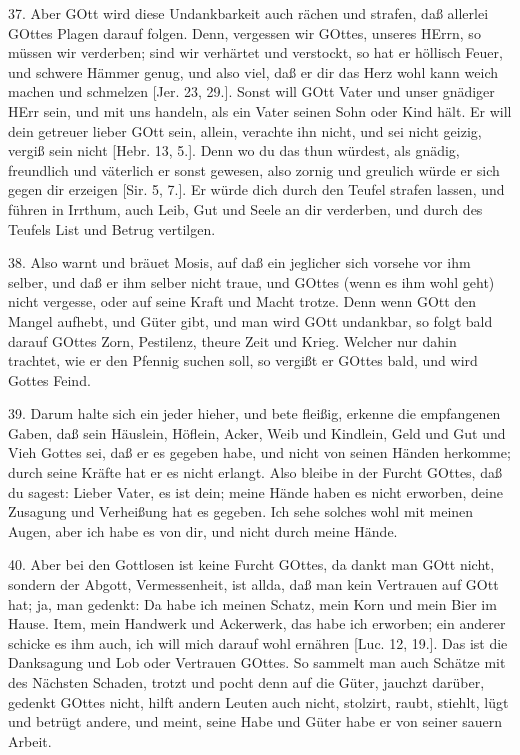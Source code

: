 37. Aber GOtt wird diese Undankbarkeit auch rächen und strafen, daß allerlei GOttes Plagen darauf folgen. Denn, vergessen wir GOttes, unseres HErrn, so müssen wir verderben; sind wir verhärtet und verstockt, so hat er höllisch Feuer, und schwere Hämmer genug, und also viel, daß er dir das Herz wohl kann weich machen und schmelzen [Jer. 23, 29.]. Sonst will GOtt Vater und unser gnädiger HErr sein, und mit uns handeln, als ein Vater seinen Sohn oder Kind hält. Er will dein getreuer lieber GOtt sein, allein, verachte ihn nicht, und sei nicht geizig, vergiß sein nicht [Hebr. 13, 5.]. Denn wo du das thun würdest, als gnädig, freundlich und väterlich er sonst gewesen, also zornig und greulich würde er sich gegen dir erzeigen [Sir. 5, 7.]. Er würde dich durch den Teufel strafen lassen, und führen in Irrthum, auch Leib, Gut und Seele an dir verderben, und durch des Teufels List und Betrug vertilgen.

38. Also warnt und bräuet Mosis, auf daß ein jeglicher sich vorsehe vor ihm selber, und daß er ihm selber nicht traue, und GOttes (wenn es ihm wohl geht) nicht vergesse, oder auf seine Kraft und Macht trotze. Denn wenn GOtt den Mangel aufhebt, und Güter gibt, und man wird GOtt undankbar, so folgt bald darauf GOttes Zorn, Pestilenz, theure Zeit und Krieg. Welcher nur dahin trachtet, wie er den Pfennig suchen soll, so vergißt er GOttes bald, und wird Gottes Feind.

39. Darum halte sich ein jeder hieher, und bete fleißig, erkenne die empfangenen Gaben, daß sein Häuslein, Höflein, Acker, Weib und Kindlein, Geld und Gut und Vieh Gottes sei, daß er es gegeben habe, und nicht von seinen Händen herkomme; durch seine Kräfte hat er es nicht erlangt. Also bleibe in der Furcht GOttes, daß du sagest: Lieber Vater, es ist dein; meine Hände haben es nicht erworben, deine Zusagung und Verheißung hat es gegeben. Ich sehe solches wohl mit meinen Augen, aber ich habe es von dir, und nicht durch meine Hände.

40. Aber bei den Gottlosen ist keine Furcht GOttes, da dankt man GOtt nicht, sondern der Abgott, Vermessenheit, ist allda, daß man kein Vertrauen auf GOtt hat; ja, man gedenkt: Da habe ich meinen Schatz, mein Korn und mein Bier im Hause. Item, mein Handwerk und Ackerwerk, das habe ich erworben; ein anderer schicke es ihm auch, ich will mich darauf wohl ernähren [Luc. 12, 19.]. Das ist die Danksagung und Lob oder Vertrauen GOttes. So sammelt man auch Schätze mit des Nächsten Schaden, trotzt und pocht denn auf die Güter, jauchzt darüber, gedenkt GOttes nicht, hilft andern Leuten auch nicht, stolzirt, raubt, stiehlt, lügt und betrügt andere, und meint, seine Habe und Güter habe er von seiner sauern Arbeit.

